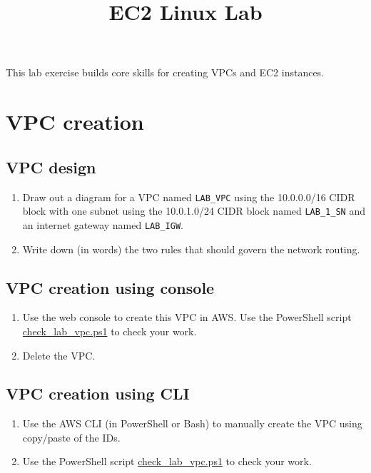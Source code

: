 \documentclass{pgnotes}
\title{EC2 Linux Lab}
\begin{document}
\maketitle

This lab exercise builds core skills for creating VPCs and EC2 instances.

\section{VPC creation} 

\subsection{VPC design}

\begin{enumerate}

\item
  Draw out a diagram for a VPC named \texttt{LAB\_VPC} using the 10.0.0.0/16 CIDR block with one subnet using the 10.0.1.0/24 CIDR block named \texttt{LAB\_1\_SN} and an internet gateway named \texttt{LAB\_IGW}.

\item 
  Write down (in words) the two rules that should govern the network routing.

\end{enumerate}

\subsection{VPC creation using console} 

\begin{enumerate}

\item
  Use the web console to create this VPC in AWS.
  Use the PowerShell script \url{check_lab_vpc.ps1} to check your work.

\item 
  Delete the VPC.

\end{enumerate}


\subsection{VPC creation using CLI} 

\begin{enumerate}

\item
  Use the AWS CLI (in PowerShell or Bash) to manually create the VPC using copy/paste of the IDs.

\item
    Use the PowerShell script \url{check_lab_vpc.ps1} to check your work.
  
\end{enumerate}
\end{document}

